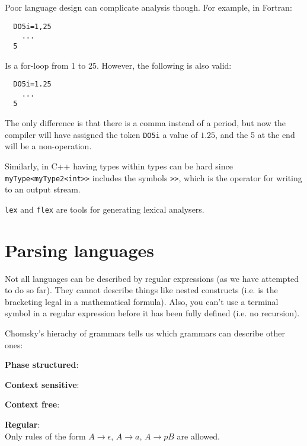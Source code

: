 Poor language design can complicate analysis though. For example, in Fortran:

\begin{verbatim}
  DO5i=1,25
    ...
  5
\end{verbatim}

Is a for-loop from 1 to 25. However, the following is also valid:

\begin{verbatim}
  DO5i=1.25
    ...
  5
\end{verbatim}


The only difference is that there is a comma instead of a period, but now the
compiler will have assigned the token \texttt{DO5i} a value of $1.25$, and the 5
at the end will be a non-operation.

Similarly, in C++ having types within types can be hard since
\texttt{myType<myType2<int>>} includes the symbols \texttt{>>}, which is the
operator for writing to an output stream.

\texttt{lex} and \texttt{flex} are tools for generating lexical analysers.


\section{Parsing languages}

Not all languages can be described by regular expressions (as we have attempted
to do so far). They cannot describe things like nested constructs (i.e. is the
bracketing legal in a mathematical formula). Also, you can't use a terminal
symbol in a regular expression before it has been fully defined (i.e. no
recursion).

Chomsky's hierachy of grammars tells us which grammars can describe other ones:

\begin{description}
  \item \textbf{Phase structured}: %
  \item \textbf{Context sensitive}: %
  \item \textbf{Context free}: %
  \item \textbf{Regular}:\\
    Only rules of the form $A \rightarrow \epsilon$, $A \rightarrow a$,
    $A \rightarrow pB$ are allowed.  %
\end{description}

